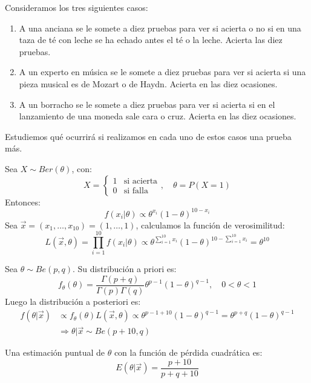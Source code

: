 \begin{example}
    Consideramos los tres siguientes casos:
    \begin{enumerate}
        \item A una anciana se le somete a diez pruebas para ver si acierta o no si en una taza de té con leche se ha echado antes el té o la leche.
              Acierta las diez pruebas.
        \item A un experto en música se le somete a diez pruebas para ver si acierta si una pieza musical es de Mozart o de Haydn.
              Acierta en las diez ocasiones.
        \item A un borracho se le somete a diez pruebas para ver si acierta si en el lanzamiento de una moneda sale cara o cruz.
              Acierta en las diez ocasiones.
    \end{enumerate}
    Estudiemos qué ocurrirá si realizamos en cada uno de estos casos una prueba más.

    Sea $X \sim Ber(\theta)$, con:
    $$X = \begin{cases}
            1 & \text{si acierta} \\
            0 & \text{si falla}
        \end{cases}, \quad \theta = P(X=1)$$
    Entonces:
    $$f(x_i|\theta) \propto \theta^{x_i}(1-\theta)^{10-x_i}$$
    Sea $\vec{x} = (x_1, \dots, x_{10}) = (1, \dots, 1)$, calculamos la función de verosimilitud:
    $$L(\vec{x}, \theta) = \prod_{i=1}^{10} f(x_i|\theta) \propto \theta^{\sum_{i=1}^{10} x_i}(1-\theta)^{10-\sum_{i=1}^{10} x_i} = \theta^{10}$$

    Sea $\theta \sim Be(p, q)$.
    Su distribución a priori es:
    $$f_\theta(\theta) = \frac{\Gamma(p+q)}{\Gamma(p)\Gamma(q)} \theta^{p-1}(1-\theta)^{q-1}, \quad 0 < \theta < 1$$
    Luego la distribución a posteriori es:
    \begin{align*}
        f(\theta|\vec{x}) & \propto f_\theta(\theta)L(\vec{x}, \theta) \propto \theta^{p-1+10}(1-\theta)^{q-1} = \theta^{p+q}(1-\theta)^{q-1} \\
                          & \Rightarrow \theta|\vec{x} \sim Be(p+10, q)
    \end{align*}

    Una estimación puntual de $\theta$ con la función de pérdida cuadrática es:
    $$E(\theta|\vec{x}) = \frac{p+10}{p+q+10}$$


\end{example}
